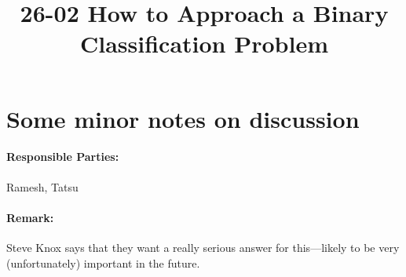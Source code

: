 \documentclass[11pt]{article}
\begin{document}
\title{26-02 How to Approach a Binary Classification Problem}

\maketitle

\section{Some minor notes on discussion}

\paragraph{Responsible Parties:} Ramesh, Tatsu

\paragraph{Remark:}
Steve Knox says that they want a really serious answer for this---likely to
be very (unfortunately) important in the future.
\end{document}
